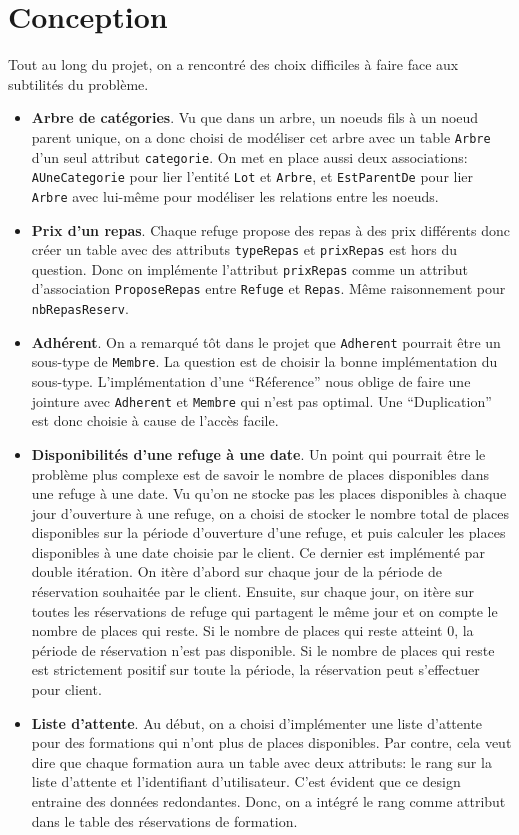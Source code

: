 \documentclass[12pt, a4paper]{article}
\newcommand\att[1]{\textnhtt{#1}}
\begin{document}
\section{Conception}
Tout au long du projet, on a rencontré des choix difficiles à faire face aux subtilités du problème.

\begin{itemize}
\item \textbf{Arbre de catégories}.
  Vu que dans un arbre, un noeuds fils à un noeud parent unique, on a donc choisi de modéliser cet arbre avec un table \att{Arbre} d'un seul attribut \att{categorie}.
  On met en place aussi deux associations: \att{AUneCategorie} pour lier l'entité \att{Lot} et \att{Arbre}, et \att{EstParentDe} pour lier \att{Arbre} avec lui-même pour modéliser les relations entre les noeuds.
\item \textbf{Prix d'un repas}.
  Chaque refuge propose des repas à des prix différents donc créer un table avec des attributs \att{typeRepas} et \att{prixRepas} est hors du question.
  Donc on implémente l'attribut \att{prixRepas} comme un attribut d'association \att{ProposeRepas} entre \att{Refuge} et \att{Repas}.
  Même raisonnement pour \att{nbRepasReserv}.
\item \textbf{Adhérent}.
  On a remarqué tôt dans le projet que \att{Adherent} pourrait être un sous-type de \att{Membre}.
  La question est de choisir la bonne implémentation du sous-type.
  L'implémentation d'une \enquote{Réference} nous oblige de faire une jointure avec \att{Adherent} et \att{Membre} qui n'est pas optimal.
  Une \enquote{Duplication} est donc choisie à cause de l'accès facile.
\item \textbf{Disponibilités d'une refuge à une date}.
  Un point qui pourrait être le problème plus complexe est de savoir le nombre de places disponibles dans une refuge à une date.
  Vu qu'on ne stocke pas les places disponibles à chaque jour d'ouverture à une refuge, on a choisi de stocker le nombre total de places disponibles sur la période d'ouverture d'une refuge, et puis calculer les places disponibles à une date choisie par le client.
  Ce dernier est implémenté par double itération.
  On itère d'abord sur chaque jour de la période de réservation souhaitée par le client.
  Ensuite, sur chaque jour, on itère sur toutes les réservations de refuge qui partagent le même jour et on compte le nombre de places qui reste.
  Si le nombre de places qui reste atteint 0, la période de réservation n'est pas disponible.
  Si le nombre de places qui reste est strictement positif sur toute la période, la réservation peut s'effectuer pour client.
\item \textbf{Liste d'attente}.
  Au début, on a choisi d'implémenter une liste d'attente pour des formations qui n'ont plus de places disponibles.
  Par contre, cela veut dire que chaque formation aura un table avec deux attributs: le rang sur la liste d'attente et l'identifiant d'utilisateur.
  C'est évident que ce design entraine des données redondantes.
  Donc, on a intégré le rang comme attribut dans le table des réservations de formation.
\end{itemize}
\end{document}
